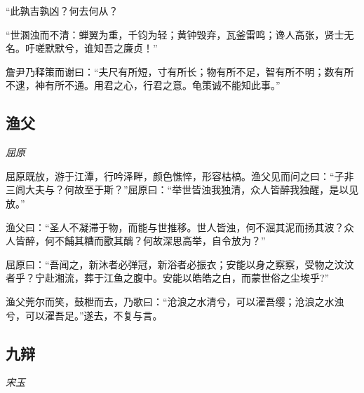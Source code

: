 \documentclass[]{article}
\begin{document}
``此孰吉孰凶？何去何从？

``世溷浊而不清：蝉翼为重，千钧为轻；黄钟毁弃，瓦釜雷鸣；谗人高张，贤士无名。吁嗟默默兮，谁知吾之廉贞！''

詹尹乃释策而谢曰：``夫尺有所短，寸有所长；物有所不足，智有所不明；数有所不逮，神有所不通。用君之心，行君之意。龟策诚不能知此事。''

\hypertarget{header-n2909}{%
\subsection{渔父}\label{header-n2909}}

\emph{屈原}

屈原既放，游于江潭，行吟泽畔，颜色憔悴，形容枯槁。渔父见而问之曰：``子非三闾大夫与？何故至于斯？''屈原曰：``举世皆浊我独清，众人皆醉我独醒，是以见放。''

渔父曰：``圣人不凝滞于物，而能与世推移。世人皆浊，何不淈其泥而扬其波？众人皆醉，何不餔其糟而歠其醨？何故深思高举，自令放为？''

屈原曰：``吾闻之，新沐者必弹冠，新浴者必振衣；安能以身之察察，受物之汶汶者乎？宁赴湘流，葬于江鱼之腹中。安能以皓皓之白，而蒙世俗之尘埃乎?''

渔父莞尔而笑，鼓枻而去，乃歌曰：``沧浪之水清兮，可以濯吾缨；沧浪之水浊兮，可以濯吾足。''遂去，不复与言。

\hypertarget{header-n2917}{%
\subsection{九辩}\label{header-n2917}}

\emph{宋玉}
\end{document}
